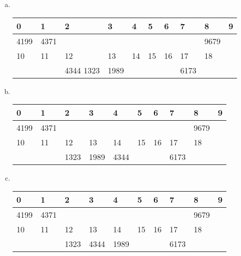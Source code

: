 \documentclass{article}
\begin{document}
\section{}
\begin{enumerate}[(a)]
\item \ 
\begin{center}
\begin{tabular}{|m{2em}<{\centering}|m{2em}<{\centering}|m{2em}<{\centering}|m{2em}<{\centering}|m{2em}<{\centering}|m{2em}<{\centering}|m{2em}<{\centering}|m{2em}<{\centering}|m{2em}<{\centering}|m{2em}<{\centering}|}
\hline
0 & 1 & 2 & 3 & 4 & 5 & 6 & 7 & 8 & 9 \\\hline
4199 & 4371 &&&&&&& 9679 & \\\hline
10 & 11 & 12 & 13 & 14 & 15 & 16 & 17 & 18 & \\\hline
& & 4344 1323 & 1989 & & & & 6173 & & \\\hline
\end{tabular}
\end{center}
\item \ 
\begin{center}
\begin{tabular}{|m{2em}<{\centering}|m{2em}<{\centering}|m{2em}<{\centering}|m{2em}<{\centering}|m{2em}<{\centering}|m{2em}<{\centering}|m{2em}<{\centering}|m{2em}<{\centering}|m{2em}<{\centering}|m{2em}<{\centering}|}
\hline
0 & 1 & 2 & 3 & 4 & 5 & 6 & 7 & 8 & 9 \\\hline
4199 & 4371 &&&&&&& 9679 & \\\hline
10 & 11 & 12 & 13 & 14 & 15 & 16 & 17 & 18 & \\\hline
& & 1323 & 1989 & 4344 & & & 6173 & & \\\hline
\end{tabular}
\end{center}
\item \ 
\begin{center}
\begin{tabular}{|m{2em}<{\centering}|m{2em}<{\centering}|m{2em}<{\centering}|m{2em}<{\centering}|m{2em}<{\centering}|m{2em}<{\centering}|m{2em}<{\centering}|m{2em}<{\centering}|m{2em}<{\centering}|m{2em}<{\centering}|}
\hline
0 & 1 & 2 & 3 & 4 & 5 & 6 & 7 & 8 & 9 \\\hline
4199 & 4371 &&&&&&& 9679 & \\\hline
10 & 11 & 12 & 13 & 14 & 15 & 16 & 17 & 18 & \\\hline
& & 1323 & 4344 & 1989 & & & 6173 & & \\\hline
\end{tabular}

\end{center}
\end{enumerate}
\end{document}
